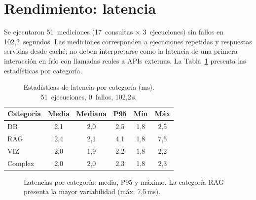 \section{Rendimiento: latencia}
\label{sec:res_latencia}

Se ejecutaron 51~mediciones (17~consultas $\times$ 3~ejecuciones) sin fallos en 102,2~segundos. Las mediciones corresponden a ejecuciones repetidas y respuestas servidas desde caché; no deben interpretarse como la latencia de una primera interacción en frío con llamadas reales a APIs externas. La Tabla~\ref{tab:res_latencia} presenta las estadísticas por categoría.

\begin{table}[H]
\centering
\caption{Estadísticas de latencia por categoría (ms). 51~ejecuciones, 0~fallos, 102,2\,s.}
\label{tab:res_latencia}
\footnotesize
\begin{tabularx}{\columnwidth}{lccccc}
\toprule
\textbf{Categoría} & \textbf{Media} & \textbf{Mediana} & \textbf{P95} & \textbf{Mín} & \textbf{Máx} \\
\midrule
DB      & 2,1 & 2,0 & 2,5 & 1,8 & 2,5 \\
\ac{RAG}     & 2,4 & 2,1 & 4,1 & 1,8 & 7,5 \\
VIZ     & 2,0 & 1,9 & 2,2 & 1,8 & 2,2 \\
Complex & 2,0 & 2,0 & 2,3 & 1,8 & 2,3 \\
\bottomrule
\end{tabularx}
\end{table}

\begin{figure}[H]
\centering
{}
\caption{Latencias por categoría: media, P95 y máximo. La categoría \acs{RAG} presenta la mayor variabilidad (máx: 7,5\,ms).}
\label{fig:res_latencia_barras}
\end{figure}

